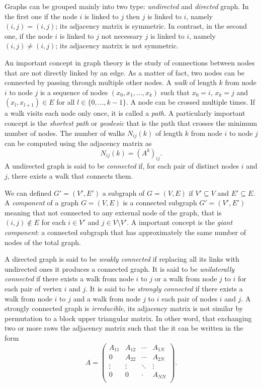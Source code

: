 Graphs can be grouped mainly into two type: \textit{undirected} and \textit{directed} graph. In the first one if the node $i$ is linked to $j$ then $j$ is linked to $i$, namely $(i, j) = (i, j)$; its adjacency matrix is symmetric.
In contrast, in the second one, if the node $i$ is linked to $j$ not necessary $j$ is linked to $i$, namely $(i, j) \neq (i, j)$; its adjacency matrix is not symmetric.

An important concept in graph theory is the study of connections between nodes that are not directly linked by an edge. As a matter of fact, two nodes can be connected by passing through multiple other nodes.
A \textit{walk} of length $k$ from node $i$ to node $j$ is a sequence of nodes $(x_0,x_1,...,x_k)$ such that $x_0=i$, $x_k=j$ and $(x_l, x_{l+1}) \in E$ for all $l \in \{0, ..., k-1\}$. A node can be crossed multiple times.  
If a walk visits each node only once, it is called a \textit{path}.
A particularly important concept is the \textit{shortest path} or \textit{geodesic} that is the path that crosses the minimum number of nodes.  
The number of walks $N_{ij}(k)$ of length $k$ from node $i$ to node $j$ can be computed using the adjacency matrix as
\begin{equation}
    N_{ij}(k) = (A^k)_{ij} .
\end{equation}
A undirected graph is said to be \textit{connected} if, for each pair of distinct nodes $i$ and $j$, there exists a walk that connects them. 

We can defined $G' =(V',E')$ a subgraph of $G= (V,E)$ if $V' \subseteq V$ and $E' \subseteq E$.
A \textit{component} of a graph $G= (V,E)$ is a connected subgraph $G' =(V',E')$ meaning that not connected to any external node of the graph, that is $(i,j)\notin E$ for each $i\in V'$ and $j\in V\setminus V'$. 
A important concept is the \textit{giant component}: a connected subgraph that has approximately the same number of nodes of the total graph. 

A directed graph is said to be \textit{weakly connected} if replacing all its links with undirected ones it produces a connected graph. 
It is said to be \textit{unilaterally connected} if there exists a walk from node $i$ to $j$ or a walk from node $j$ to $i$ for each pair of vertex $i$ and $j$. 
It is said to be \textit{strongly connected} if there exists a walk from node $i$ to $j$ and a walk from node $j$ to $i$ each pair of nodes $i$ and $j$.
A strongly connected graph is \textit{irreducible}, its adjacency matrix is not similar by permutation to a block upper triangular matrix. In other word, that exchanging two or more raws the adjacency matrix such that the it can be written in the form
\begin{equation}
    A = \begin{pmatrix}
        A_{11} & A_{12} & \cdots & A_{1N}\\
        0 & A_{22}& \cdots & A_{2N}\\
        \vdots & \vdots & \ddots & \vdots\\
        0 &0 &\cdot & A_{NN}\\
    \end{pmatrix} .
\end{equation}

